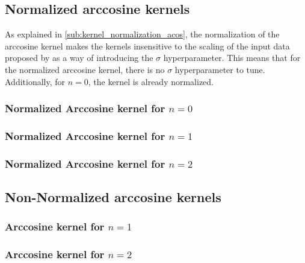 

\subsection{Normalized arccosine kernels}

As explained in \cref{sub:kernel_normalization_acos}, the normalization of the
arccosine kernel makes the kernels insensitive to the scaling of the input data
proposed by \cite{pandeyGoDeepWide2014} as a way of introducing the $\sigma$
hyperparameter. This means that for the normalized arccosine kernel, there is
no $\sigma$ hyperparameter to tune. Additionally, for $n=0$, the kernel is
already normalized.

\subsubsection{Normalized Arccosine kernel for $n=0$}
\subsubsection{Normalized Arccosine kernel for $n=1$}
\subsubsection{Normalized Arccosine kernel for $n=2$}

\subsection{Non-Normalized arccosine kernels}

\subsubsection{Arccosine kernel for $n=1$}

\subsubsection{Arccosine kernel for $n=2$}
